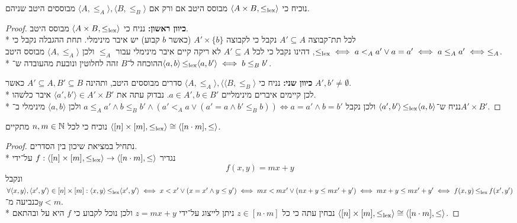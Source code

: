 \Subquestion{}
נוכיח כי $\langle A \times B, \operatorname{\le_\text{lex}} \rangle$ מבוסס היטב אם ורק אם $\langle A, \le_A \rangle, \langle B, \le_B \rangle$ מבוססים היטב שניהם.
\begin{proof}
	\textbf{כיוון ראשון:}
	נניח כי $\langle A \times B, \operatorname{\le_\text{lex}} \rangle$ מבוסס היטב. \\*
	לכל תת־קבוצה $A' \subseteq A$ נקבל כי לקבוצה $A' \times \{ b \}$ (כאשר $b$ קבוע) יש איבר מינימלי. תחת ההגבלה נקבל כי $\operatorname{\le_\text{lex}} \iff a <_A a' \lor a = a' \iff a \le_A a' \iff \le_A$,
	דהינו נקבל כי לכל $A' \subseteq A$ לא ריקה קיים איבר מינימלי עבור $\le_A$ ולכן $\langle A, \le_A \rangle$ מבוסס היטב. \\*
	ההוכחה ל־$B$ זהה לחלוטין ונובעת מהעובדה ש־$\langle a, b \rangle \operatorname{\le_\text{lex}} \langle a, b' \rangle \iff b \le_B b'$.

	\textbf{כיוון שני:}
	נניח כי $\langle A, \le_A \rangle, \langle \langle B, \le_B \rangle$ סדרים מבוססים היטב, ותהינה $A' \subseteq A, B' \subseteq B$ כאשר $A', b' \ne \emptyset$. \\*
	לכן קיימים איברים מינימליים $a \in A', b \in B'$.
	נבדוק עתה את $\langle a', b' \rangle \in A' \times B'$ איבר כלשהו. \\*
	נניח ש־$\langle a', b' \rangle \operatorname{\le_\text{lex}} \langle a, b \rangle$ ולכן נקבל $a \le_A a' \land b \le_B b' \land (a' <_A a \lor (a' = a \land b' \le_B b)) \iff a = a' \land b = b'$ ולכן $\langle a, b \rangle$ מינימלי ב־$A' \times B'$.
\end{proof}

\Question{}
נוכיח כי לכל $n, m \in \mathbb{N}$ מתקיים $\langle [n] \times [m], \operatorname{\le_\text{lex}} \rangle \cong \langle [n \cdot m ], \le \rangle$.
\begin{proof}
	נתחיל במציאת שיכון בין הסדרים. \\*
	נגדיר $f : \langle [n] \times [m], \operatorname{\le_\text{lex}} \rangle \to \langle [n \cdot m ], \le \rangle$ על־ידי
	\[
		f(x, y) = mx + y
	\]
	ונקבל $\forall \langle x, y \rangle, \langle x', y' \rangle \in [n] \times [m] : \langle x, y \rangle \operatorname{\le_\text{lex}} \langle x', y' \rangle \iff x < x' \lor (x = x' \land y \le y') \iff mx < mx' \lor (nx + y \le mx' + y') \iff mx + y \le mx' + y' \iff f(x, y) \operatorname{\le_\text{lex}} f(x', y')$ כנביעה מ־$y < m$. \\*
	נבחין עתה כי כל $z \in [n \cdot m ]$ ניתן לייצוג על־ידי $z = mx + y$ ולכן נוכל לקבוע כי $f$ היא על ובהתאם $\langle [n] \times [m], \operatorname{\le_\text{lex}} \rangle \cong \langle [n \cdot m ], \le \rangle$.
\end{proof}

